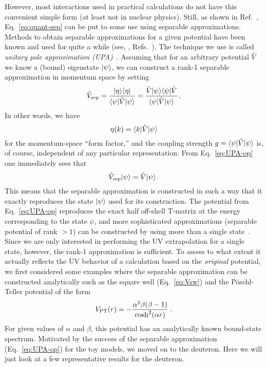 	However, most	interactions used in practical calculations do not have this
	convenient simple form (at least not in nuclear physics).  Still,
	as shown in Ref.~\cite{Konig:2014hma},	Eq.~\eqref{eq:quant-sep} can be put
	to some use using separable approximations.
	Methods to obtain separable approximations for a given potential have
	been known and used for quite a while (see, \eg,
	Refs.~\cite{Harms:1970hd,Ernst:1973zzb,elgaroy1998}).
	The technique we use is called \emph{unitary pole approximation
	(UPA)}~\cite{Ernst:1973zzb,Lovelace:1964aa}.  Assuming that for an
	arbitrary potential $\hat{V}$ we know a (bound) eigenstate ${|\psi\rangle}$, we
	can	construct a rank-1 separable approximation in momentum space by setting
	\begin{equation}
	 \hat{V}_\text{sep} =
	 \frac{{|\eta\rangle}{\langle\eta|}}
	 {\langle \psi|\hat{V}|\psi\rangle} =
	 \frac{\hat{V}{|\psi\rangle}{\langle\psi|}\hat{V}}
	 {\langle \psi|\hat{V}|\psi\rangle} \,.
	\label{eq:UPA-op}
	\end{equation}
	In other words, we have
	\begin{equation}
	 \eta(k) = \langle k|\hat{V}|\psi\rangle
	 \label{eq:form_factor_def}
	\end{equation}
	for the momentum-space ``form factor,'' and the coupling strength
	$g=\langle \psi|\hat{V}|\psi\rangle$ is, of course, independent of any
	particular representation.  From Eq.~\eqref{eq:UPA-op} one immediately
	sees that
	\begin{equation}
	 \hat{V}_\text{sep}{|\psi\rangle} = \hat{V}{|\psi\rangle} \,.
	\label{eq:Vsep-psi-V-psi}
	\end{equation}
	This means that the separable approximation is constructed in such a
	way that it exactly reproduces the state ${|\psi\rangle}$ used for its
	construction.  The potential from Eq.~\eqref{eq:UPA-op} reproduces the exact
	half off-shell T-matrix at the energy corresponding to the state
	$\psi$, and more sophisticated approximations (separable potential of
	rank $>1$) can be constructed by using more than a single
	state~\cite{Ernst:1973zzb}.  Since we are only interested in
	performing the UV extrapolation for a single state, however, the
	rank-1 approximation is sufficient.  To assess
	to what extent it actually reflects the UV behavior of a calculation
	based on the \emph{original} potential, we first considered some
	examples where the separable approximation can be constructed
	analytically such as the square well (Eq.~\eqref{eq:Vsw}) and the
	P\"{o}schl-Teller potential of the form
	\begin{equation}
	V_{\text{PT}}(r) = -\frac{\alpha^2 \beta(\beta-1)}{\cosh^2(\alpha r)}\;.
	\label{eq:V-PT}
	\end{equation}
	For given values of $\alpha$ and $\beta$, this potential has an
	analytically known bound-state spectrum.  Motivated by the success of the
	separable approximation (Eq.~\eqref{eq:UPA-op}) for the toy models,
	we moved on to the deuteron.  Here we will just look at a few representative
	results for the deuteron.

